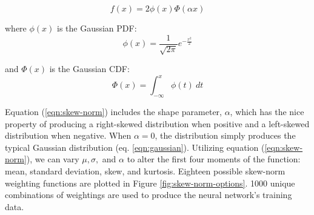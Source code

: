 \begin{equation}
	\label{eqn:skew-norm}
	f(x)=2\phi (x)\Phi (\alpha x)
\end{equation}
 
\noindent
where $ \phi(x) $ is the Gaussian PDF:
\begin{equation}
	\label{eqn:skew-norm-pdf}
	\phi (x)={\frac  {1}{{\sqrt  {2\pi }}}}e^{{-{\frac  {x^{2}}{2}}}}
\end{equation}

\noindent
and $ \Phi (x) $ is the Gaussian CDF:
\begin{equation}
	\label{eqn:skew-norm-cdf}
	\Phi (x)=\int _{{-\infty }}^{{x}}\phi (t)\ dt
\end{equation}



\noindent
Equation (\ref{eqn:skew-norm}) includes the shape parameter, $ \alpha $, which has the nice property of producing a right-skewed distribution when positive and a left-skewed distribution when negative. When $ \alpha=0 $, the distribution simply produces the typical Gaussian distribution (eq. \ref{eqn:gaussian}). Utilizing equation (\ref{eqn:skew-norm}), we can vary $ \mu, \sigma,  $ and $ \alpha $ to alter the first four moments of the function: mean, standard deviation, skew, and kurtosis. Eighteen possible skew-norm weighting functions are plotted in Figure \ref{fig:skew-norm-options}. 1000 unique combinations of weightings are used to produce the neural network's training data.

